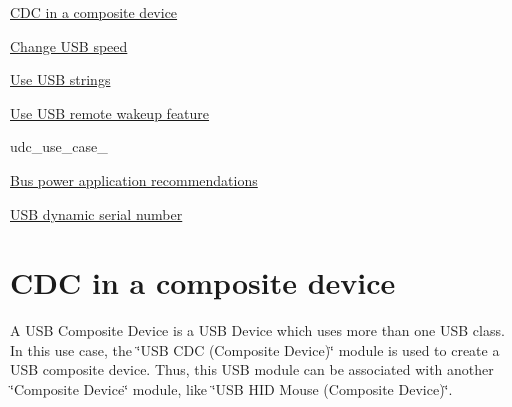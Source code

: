\begin{DoxyItemize}
\item \hyperlink{udi_cdc_use_case_composite}{C\-D\-C in a composite device}
\item \hyperlink{udc_use_case_1}{Change U\-S\-B speed}
\item \hyperlink{udc_use_case_2}{Use U\-S\-B strings}
\item \hyperlink{udc_use_case_3}{Use U\-S\-B remote wakeup feature}
\item udc\-\_\-use\-\_\-case\-\_
\item \hyperlink{udc_use_case_5}{Bus power application recommendations}
\item \hyperlink{udc_use_case_6}{U\-S\-B dynamic serial number} 
\end{DoxyItemize}\hypertarget{udi_cdc_use_case_composite}{}\section{C\-D\-C in a composite device}\label{udi_cdc_use_case_composite}
A U\-S\-B Composite Device is a U\-S\-B Device which uses more than one U\-S\-B class. In this use case, the \char`\"{}\-U\-S\-B C\-D\-C (\-Composite Device)\char`\"{} module is used to create a U\-S\-B composite device. Thus, this U\-S\-B module can be associated with another \char`\"{}\-Composite Device\char`\"{} module, like \char`\"{}\-U\-S\-B H\-I\-D Mouse (\-Composite Device)\char`\"{}.

